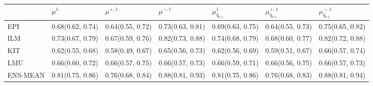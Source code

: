 \begin{tabular}{l p{} p{} p{} p{} p{} p{}}
\toprule
 & $\mu^1$ & $\mu^{+, 1}$ & $\mu^{-, 1}$ & $\mu^1_{q_{0.1}}$ & $\mu^{+, 1}_{q_{0.1}}$ & $\mu^{-, 1}_{q_{0.1}}$ \\
\midrule
EPI & {0.68\newline(0.62, 0.74)} & {0.64\newline(0.55, 0.72)} & {0.73\newline(0.63, 0.81)} & {0.69\newline(0.63, 0.75)} & {0.64\newline(0.55, 0.73)} & {0.75\newline(0.65, 0.82)} \\
ILM & {0.73\newline(0.67, 0.79)} & {0.67\newline(0.59, 0.76)} & {0.82\newline(0.73, 0.88)} & {0.74\newline(0.68, 0.79)} & {0.68\newline(0.60, 0.77)} & {0.82\newline(0.72, 0.88)} \\
KIT & {0.62\newline(0.55, 0.68)} & {0.58\newline(0.49, 0.67)} & {0.65\newline(0.56, 0.73)} & {0.62\newline(0.56, 0.69)} & {0.59\newline(0.51, 0.67)} & {0.66\newline(0.57, 0.74)} \\
LMU & {0.66\newline(0.60, 0.72)} & {0.66\newline(0.57, 0.75)} & {0.66\newline(0.57, 0.73)} & {0.66\newline(0.59, 0.71)} & {0.66\newline(0.56, 0.75)} & {0.66\newline(0.57, 0.73)} \\
ENS-MEAN & {0.81\newline(0.75, 0.86)} & {0.76\newline(0.68, 0.84)} & {0.88\newline(0.81, 0.93)} & {0.81\newline(0.75, 0.86)} & {0.76\newline(0.68, 0.83)} & {0.88\newline(0.81, 0.94)} \\

\end{tabular}
